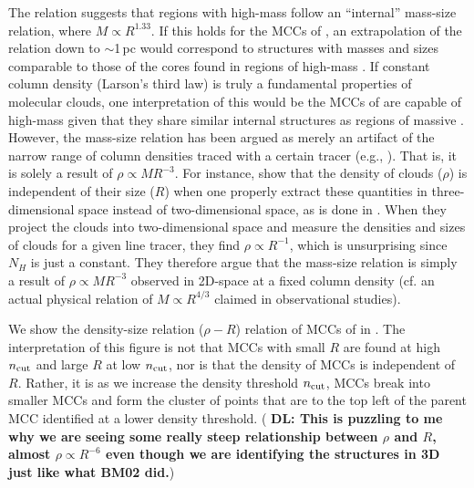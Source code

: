 \IfFileExists{emulateapjlegacy.cls}{\documentclass[iop]{emulateapjlegacy}}{\documentclass[iop]{emulateapj}}
\newcommand{\DL}[1]{({\bf \color{dlcolor} DL: #1})}
\newcommand{\MM}[1]{({\bf \color{mmcolor} MM: #1})}
\begin{document}
The \citet{Kauffmann10c} relation suggests that regions with high-mass \SF follow
an ``internal'' mass-size relation, where $M\propto R^{1.33}$.
If this holds for the MCCs of \flower, an extrapolation of the \citet{Kauffmann10c} relation down to $\sim$1\,pc would correspond
to structures with masses and sizes comparable to those of the cores found in regions of high-mass \SF.
If constant column density (Larson's third law) is truly a fundamental properties of molecular clouds,
one interpretation of this would be the MCCs of \flower are capable of high-mass \SF given that they share similar internal structures as
regions of massive \SF.
However, the mass-size relation has been argued as merely an artifact of the narrow range of column densities traced
with a certain tracer (e.g., \citealt{Ballesteros11}).
That is, it is solely a result of $\rho\propto M R^{-3}$.
For instance, \citet{Ballesteros02a} show that the density
of clouds ($\rho$) is independent of their size ($R$) when one properly extract these quantities in three-dimensional space instead of
two-dimensional space, as is done in \obs.
When they project the clouds into two-dimensional space and measure the densities and sizes of clouds for a given
line tracer, they find $\rho \propto R^{-1}$, which is unsurprising since $N_H$ is just a constant.
They therefore argue that the mass-size relation is simply a result of $\rho\propto M R^{-3}$
observed in 2D-space at a fixed column density (cf. an actual physical relation of $M \propto R^{4/3}$ claimed in
observational studies). %

We show the density-size relation ($\rho - R$) relation of MCCs of \flower in .
The interpretation of this figure is not that MCCs with small $R$ are found at high $n_{\rm cut}$ and large $R$ at low $n_{\rm cut}$, nor is that
the density of MCCs is independent of $R$. Rather, it is as we increase the density threshold $n_{\rm cut}$, MCCs break into smaller MCCs and
form the cluster of points that are to the top left of the parent MCC identified at a lower density threshold.
\DL{This is puzzling to me why we are seeing some really steep relationship between $\rho$ and $R$, almost $\rho \propto R^{-6}$
even though we are identifying the structures in 3D just like what BM02 did.}
\end{document}
